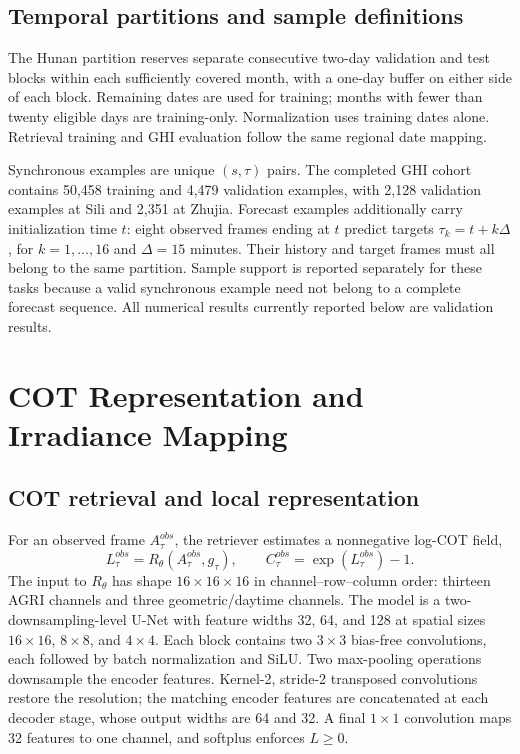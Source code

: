 \documentclass[11pt]{article}
\begin{document}
\subsection{Temporal partitions and sample definitions}
The Hunan partition reserves separate consecutive two-day validation and test blocks within each sufficiently covered month, with a one-day buffer on either side of each block. Remaining dates are used for training; months with fewer than twenty eligible days are training-only. Normalization uses training dates alone. Retrieval training and GHI evaluation follow the same regional date mapping.

Synchronous examples are unique $(s,\tau)$ pairs. The completed GHI cohort contains 50,458 training and 4,479 validation examples, with 2,128 validation examples at Sili and 2,351 at Zhujia. Forecast examples additionally carry initialization time $t$: eight observed frames ending at $t$ predict targets $\tau_k=t+k\Delta$, for $k=1,\ldots,16$ and $\Delta=15$ minutes. Their history and target frames must all belong to the same partition. Sample support is reported separately for these tasks because a valid synchronous example need not belong to a complete forecast sequence. All numerical results currently reported below are validation results.
\section{COT Representation and Irradiance Mapping}
\subsection{COT retrieval and local representation}
For an observed frame $A^{obs}_\tau$, the retriever estimates a nonnegative log-COT field,
\begin{equation}
L^{obs}_\tau=R_\theta(A^{obs}_\tau,g_\tau),\qquad
C^{obs}_\tau=\exp(L^{obs}_\tau)-1 .
\label{eq:retrieval}
\end{equation}
The input to $R_\theta$ has shape $16\times16\times16$ in channel--row--column order: thirteen AGRI channels and three geometric/daytime channels. The model is a two-downsampling-level U-Net with feature widths 32, 64, and 128 at spatial sizes $16\times16$, $8\times8$, and $4\times4$. Each block contains two $3\times3$ bias-free convolutions, each followed by batch normalization and SiLU. Two max-pooling operations downsample the encoder features. Kernel-2, stride-2 transposed convolutions restore the resolution; the matching encoder features are concatenated at each decoder stage, whose output widths are 64 and 32. A final $1\times1$ convolution maps 32 features to one channel, and softplus enforces $L\geq0$.
\end{document}
